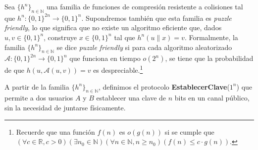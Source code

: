 
Sea $\{h^n\}_{n \in \mathbb{N}}$ una familia de funciones de compresión resistente a colisiones tal que $h^n : \{0,1\}^{2n} \to \{0,1\}^{n}$. Supondremos también que esta familia es \textit{puzzle friendly}, lo que significa que no existe un algoritmo eficiente que, dados $u, v \in \{0,1\}^n$, construye $x \in \{0,1\}^n$ tal que $h^n(u \| x) = v$. Formalmente, la familia $\{h^n\}_{n \in \mathbb{N}}$ se dice \textit{puzzle
friendly} si para cada algoritmo aleatorizado $\mathcal{A}:\{0,1\}^{2n} \to \{0,1\}^{n}$ que
funciona en tiempo $o(2^n)$, se tiene que la probabilidad de que $h(u, \mathcal{A}(u,v))=v$ es despreciable.\footnote{Recuerde que una función $f(n)$ es $o(g(n))$ si se cumple que $(\forall c \in \mathbb{R}, c > 0)(\exists n_0 \in \mathbb{N})(\forall n \in \mathbb{N}, n \geq n_0)(f(n) \leq c \cdot g(n))$.}

A partir de la familia $\{h^n\}_{n \in \mathbb{N}}$, definimos el
protocolo {\bf EstablecerClave}($1^n$) que permite a dos usuarios $A$ y $B$
establecer una clave de $n$ bits en un canal público, sin la necesidad de juntarse físicamente.

